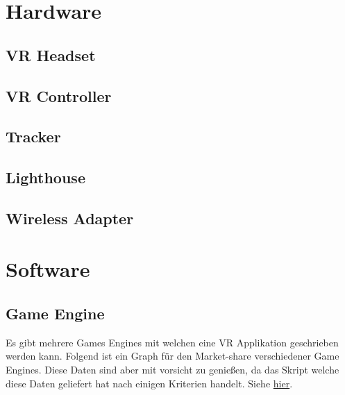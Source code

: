 \section{Hardware}
\lipsum[5-12]

\subsection{VR Headset}
\lipsum[5-12]

\subsection{VR Controller}
\lipsum[5-12]

\subsection{Tracker}
\lipsum[5-12]

\subsection{Lighthouse}
\lipsum[5-12]

\subsection{Wireless Adapter }
\lipsum[5-12]

\section{Software}

\subsection{Game Engine}

Es gibt mehrere Games Engines mit welchen eine VR Applikation geschrieben werden kann.
Folgend ist ein Graph für den Market-share verschiedener Game Engines.
Diese Daten sind aber mit vorsicht zu genießen, da das Skript welche diese Daten geliefert hat nach einigen Kriterien handelt.
Siehe \href{https://www.reddit.com/r/gamedev/comments/8s20qp/i_researched_the_market_share_of_game_engines_on/}{hier}.

